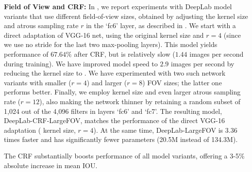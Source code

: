 
\textbf{Field of View and CRF:}
 In , we report experiments with DeepLab model variants that use
different field-of-view sizes, obtained by adjusting the kernel size and atrous
sampling rate $r$ in the `fc6' layer, as described in .
We start with a direct adaptation of VGG-16 net, using the original 
kernel size and $r = 4$ (since we use no stride for the last two max-pooling
layers). This model yields performance of $67.64\%$ after CRF, but is relatively
slow ($1.44$ images per second during training). We have improved model speed to
$2.9$ images per second by reducing the kernel size to . We have
experimented with two such network variants with smaller ($r = 4$) and larger
($r = 8$) FOV sizes; the latter one performs better. Finally, we employ kernel
size  and even larger atrous sampling rate ($r = 12$), also making the
network thinner by retaining a random subset of 1,024 out of the 4,096 filters
in layers `fc6' and `fc7'. The resulting model, DeepLab-CRF-LargeFOV, matches
the performance of the direct VGG-16 adaptation ( kernel size, $r = 4$).
At the same time, DeepLab-LargeFOV is $3.36$ times faster and has significantly
fewer parameters (20.5M instead of 134.3M).

The CRF substantially boosts performance of all model variants, offering a 3-5\%
absolute increase in mean IOU.

